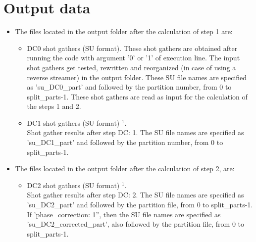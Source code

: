 \documentclass[11pt, oneside]{article}   	%
\begin{document}
\section{Output data}\label{sec5}

\begin{itemize}

\item The files located in the output folder after the calculation of step 1 are:

\begin{itemize}
 
 \item DC0 shot gathers (SU format). These shot gathers are obtained after running the code with argument '0' or '1' of execution line. The input shot gathers get tested, rewritten and reorganized (in case of using a reverse streamer) in the output folder. These SU file names are specified as 'su\_DC0\_part' and followed by the partition number, from 0 to split\_parts-1. These shot gathers are read as input for the calculation of the steps 1 and 2.
  
 \item DC1 shot gathers (SU format) $^{1}$.\\
 Shot gather results after step DC: 1. The SU file names are specified as 'su\_DC1\_part' and followed by the partition number, from 0 to split\_parts-1.

\end{itemize}

\item The files located in the output folder after the calculation of step 2, are:

\begin{itemize}
 
 
  \item DC2 shot gathers (SU format) $^{1}$.\\
Shot gather results after step DC: 2. The SU file names are specified as 'su\_DC2\_part' and followed by the partition file, from 0 to split\_parts-1. If 'phase\_correction: 1'', then the SU file names are specified as 'su\_DC2\_corrected\_part', also followed by the partition file, from 0 to split\_parts-1.


\end{itemize}
\end{itemize}
\end{document}
